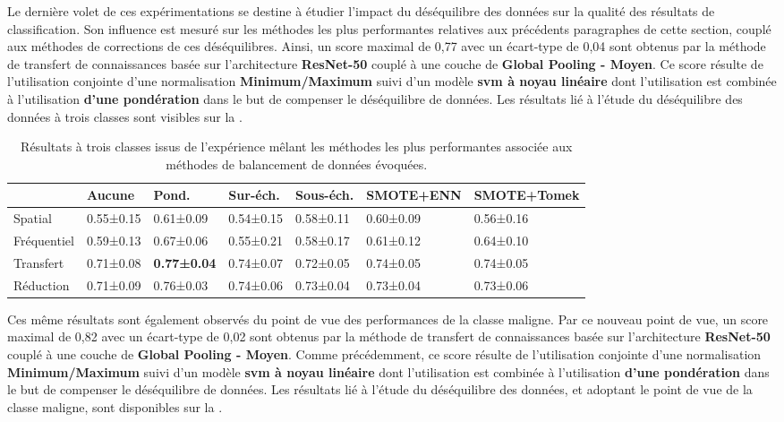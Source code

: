 Le dernière volet de ces expérimentations se destine à étudier l'impact du déséquilibre des données sur la qualité des résultats de classification. Son influence est mesuré sur les méthodes les plus performantes relatives aux précédents paragraphes de cette section, couplé aux méthodes de corrections de ces déséquilibres. Ainsi, un score maximal de 0,77 avec un écart-type de 0,04 sont obtenus par la méthode de transfert de connaissances basée sur l'architecture \textbf{ResNet-50} couplé à une couche de \textbf{Global Pooling - Moyen}. Ce score résulte de l'utilisation conjointe d'une normalisation \textbf{Minimum/Maximum} suivi d'un modèle \textbf{\gls{svm} à noyau linéaire} dont l'utilisation est combinée à l'utilisation \textbf{d'une pondération} dans le but de compenser le déséquilibre de données. Les résultats lié à l'étude du déséquilibre des données à trois classes sont visibles sur la .\par

\begin{table}[H]
    \begin{tabular}{lllllll}
        \toprule
                    & Aucune    & Pond.             & Sur-éch. & Sous-éch. & SMOTE+ENN & SMOTE+Tomek\\ \hline
        Spatial     & 0.55±0.15 & 0.61±0.09         & 0.54±0.15& 0.58±0.11 & 0.60±0.09 & 0.56±0.16  \\
        Fréquentiel & 0.59±0.13 & 0.67±0.06         & 0.55±0.21& 0.58±0.17 & 0.61±0.12 & 0.64±0.10  \\ \rowcolor[HTML]{E7E6E6}
        Transfert   & 0.71±0.08 & \textbf{0.77±0.04}& 0.74±0.07& 0.72±0.05 & 0.74±0.05 & 0.74±0.05  \\
        Réduction   & 0.71±0.09 & 0.76±0.03         & 0.74±0.06& 0.73±0.04 & 0.73±0.04 & 0.73±0.06  \\ \bottomrule
    \end{tabular}
    \caption{Résultats à trois classes issus de l'expérience mêlant les méthodes les plus performantes associée aux méthodes de balancement de données évoquées.}
    \label{tab:results_balancement_multi}
\end{table}\par

Ces même résultats sont également observés du point de vue des performances de la classe maligne. Par ce nouveau point de vue, un score maximal de 0,82 avec un écart-type de 0,02 sont obtenus par la méthode de transfert de connaissances basée sur l'architecture \textbf{ResNet-50} couplé à une couche de \textbf{Global Pooling - Moyen}. Comme précédemment, ce score résulte de l'utilisation conjointe d'une normalisation \textbf{Minimum/Maximum} suivi d'un modèle \textbf{\gls{svm} à noyau linéaire} dont l'utilisation est combinée à l'utilisation \textbf{d'une pondération} dans le but de compenser le déséquilibre de données. Les résultats lié à l'étude du déséquilibre des données, et adoptant le point de vue de la classe maligne, sont disponibles sur la .\par

